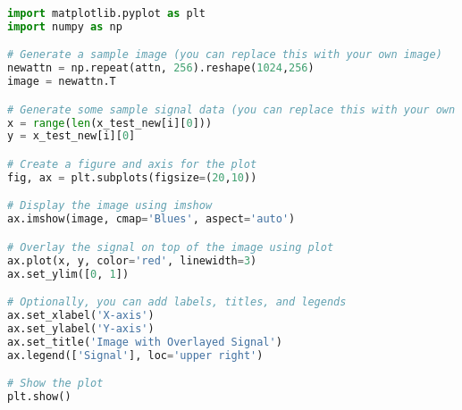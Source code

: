 \begin{lstlisting}[language=Python]
import matplotlib.pyplot as plt
import numpy as np

# Generate a sample image (you can replace this with your own image)
newattn = np.repeat(attn, 256).reshape(1024,256)
image = newattn.T

# Generate some sample signal data (you can replace this with your own data)
x = range(len(x_test_new[i][0]))
y = x_test_new[i][0]

# Create a figure and axis for the plot
fig, ax = plt.subplots(figsize=(20,10))

# Display the image using imshow
ax.imshow(image, cmap='Blues', aspect='auto')

# Overlay the signal on top of the image using plot
ax.plot(x, y, color='red', linewidth=3)
ax.set_ylim([0, 1])

# Optionally, you can add labels, titles, and legends
ax.set_xlabel('X-axis')
ax.set_ylabel('Y-axis')
ax.set_title('Image with Overlayed Signal')
ax.legend(['Signal'], loc='upper right')

# Show the plot
plt.show()
\end{lstlisting}
